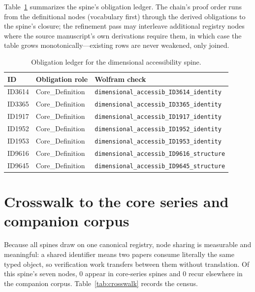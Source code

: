 \documentclass[11pt]{article}
\theoremstyle{remark}
\begin{document}
Table~\ref{tab:obligations} summarizes the spine's obligation ledger. The chain's proof order runs from the definitional nodes (vocabulary first) through the derived obligations to the spine's closure; the refinement pass may interleave additional registry nodes where the source manuscript's own derivations require them, in which case the table grows monotonically---existing rows are never weakened, only joined.

\begin{table}[ht]
\centering
\small
\caption{Obligation ledger for the dimensional accessibility spine.}
\label{tab:obligations}
\begin{tabular}{llp{6.2cm}}
\toprule
ID & Obligation role & Wolfram check \\
\midrule
ID3614 & Core\_Definition & \texttt{dimensional\_accessib\_ID3614\_identity} \\
ID3365 & Core\_Definition & \texttt{dimensional\_accessib\_ID3365\_identity} \\
ID1917 & Core\_Definition & \texttt{dimensional\_accessib\_ID1917\_identity} \\
ID1952 & Core\_Definition & \texttt{dimensional\_accessib\_ID1952\_identity} \\
ID1953 & Core\_Definition & \texttt{dimensional\_accessib\_ID1953\_identity} \\
ID9616 & Core\_Definition & \texttt{dimensional\_accessib\_ID9616\_structure} \\
ID9645 & Core\_Definition & \texttt{dimensional\_accessib\_ID9645\_structure} \\
\bottomrule
\end{tabular}
\end{table}

\section{Crosswalk to the core series and companion corpus}
\label{sec:crosswalk}

Because all spines draw on one canonical registry, node sharing is measurable and meaningful: a shared identifier means two papers consume literally the same typed object, so verification work transfers between them without translation. Of this spine's seven nodes, 0 appear in core-series spines and 0 recur elsewhere in the companion corpus. Table~\ref{tab:crosswalk} records the census.
\end{document}

